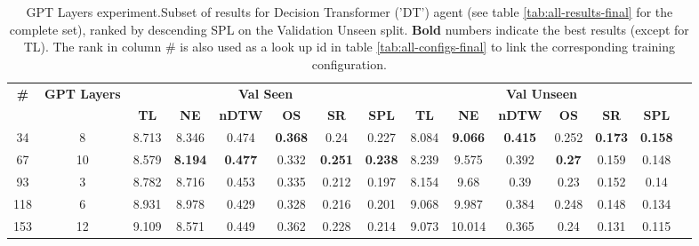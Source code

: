 \begin{table}
\centering
\caption{\label{tab:dt_layers}GPT Layers experiment.Subset of results for Decision Transformer ('DT') agent (see table \ref{tab:all-results-final} for the complete set), ranked by descending SPL on the Validation Unseen split. \textbf{Bold} numbers indicate the best results (except for TL). The rank in column \# is also used as a look up id in table \ref{tab:all-configs-final} to link the corresponding training configuration.}
\begin{tabular}{@{\hskip3pt}c@{\hskip3pt}c@{\hskip3pt}c@{\hskip3pt}c@{\hskip3pt}c@{\hskip3pt}c@{\hskip3pt}c@{\hskip3pt}c@{\hskip3pt}c@{\hskip3pt}c@{\hskip3pt}c@{\hskip3pt}c@{\hskip3pt}c@{\hskip3pt}c@{\hskip3pt}c}
\toprule
                                  \textbf{\#} & \textbf{GPT Layers} & \multicolumn{6}{c}{\textbf{Val Seen}} & \multicolumn{6}{c}{\textbf{Val Unseen}} \\
\cmidrule(l){3-8}\cmidrule(l){9-14}\textbf{~} &          \textbf{~} &       \textbf{TL} &     \textbf{NE} &   \textbf{nDTW} &     \textbf{OS} &     \textbf{SR} &    \textbf{SPL} &         \textbf{TL} &     \textbf{NE} &   \textbf{nDTW} &    \textbf{OS} &     \textbf{SR} &    \textbf{SPL} \\
\midrule
                                           34 &                   8 &             8.713 &           8.346 &           0.474 &  \textbf{0.368} &            0.24 &           0.227 &               8.084 &  \textbf{9.066} &  \textbf{0.415} &          0.252 &  \textbf{0.173} &  \textbf{0.158} \\
                                           67 &                  10 &             8.579 &  \textbf{8.194} &  \textbf{0.477} &           0.332 &  \textbf{0.251} &  \textbf{0.238} &               8.239 &           9.575 &           0.392 &  \textbf{0.27} &           0.159 &           0.148 \\
                                           93 &                   3 &             8.782 &           8.716 &           0.453 &           0.335 &           0.212 &           0.197 &               8.154 &            9.68 &            0.39 &           0.23 &           0.152 &            0.14 \\
                                          118 &                   6 &             8.931 &           8.978 &           0.429 &           0.328 &           0.216 &           0.201 &               9.068 &           9.987 &           0.384 &          0.248 &           0.148 &           0.134 \\
                                          153 &                  12 &             9.109 &           8.571 &           0.449 &           0.362 &           0.228 &           0.214 &               9.073 &          10.014 &           0.365 &           0.24 &           0.131 &           0.115 \\
\bottomrule
\end{tabular}
\end{table}
